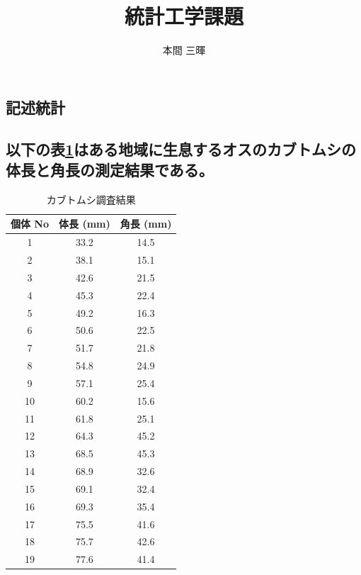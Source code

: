 \documentclass[titlepage,a4paper]{jsarticle}
\title{統計工学課題}
\author{本間 三暉}
\begin{document}
\maketitle

\section{ }%
\subsection{記述統計}
\subsection*{以下の表\ref{tab:kabuto}はある地域に生息するオスのカブトムシの体長と角長の測定結果である。}
\begin{longtable}{|c|c|c|}
  \caption{カブトムシ調査結果}
  \label{tab:kabuto}        \\
  \hline
  個体 No & 体長 (mm) & 角長 (mm) \\ \hline
  \endhead
  1     & 33.2    & 14.5    \\ \hline
  2     & 38.1    & 15.1    \\ \hline
  3     & 42.6    & 21.5    \\ \hline
  4     & 45.3    & 22.4    \\ \hline
  5     & 49.2    & 16.3    \\ \hline
  6     & 50.6    & 22.5    \\ \hline
  7     & 51.7    & 21.8    \\ \hline
  8     & 54.8    & 24.9    \\ \hline
  9     & 57.1    & 25.4    \\ \hline
  10    & 60.2    & 15.6    \\ \hline
  11    & 61.8    & 25.1    \\ \hline
  12    & 64.3    & 45.2    \\ \hline
  13    & 68.5    & 45.3    \\ \hline
  14    & 68.9    & 32.6    \\ \hline
  15    & 69.1    & 32.4    \\ \hline
  16    & 69.3    & 35.4    \\ \hline
  17    & 75.5    & 41.6    \\ \hline
  18    & 75.7    & 42.6    \\ \hline
  19    & 77.6    & 41.4    \\ \hline

\end{longtable}
\end{document}
